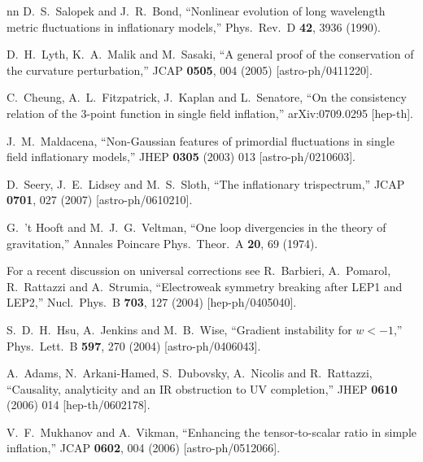 \documentclass[12pt,letterpaper]{article}
\begin{document}
{\begin{thebibliography}{nn}
  D.~S.~Salopek and J.~R.~Bond,
  ``Nonlinear evolution of long wavelength metric fluctuations in inflationary
  models,''
  Phys.\ Rev.\  D {\bf 42}, 3936 (1990).

  D.~H.~Lyth, K.~A.~Malik and M.~Sasaki,
  ``A general proof of the conservation of the curvature perturbation,''
  JCAP {\bf 0505}, 004 (2005)
  [astro-ph/0411220].

  C.~Cheung, A.~L.~Fitzpatrick, J.~Kaplan and L.~Senatore,
  ``On the consistency relation of the 3-point function in single
  field inflation,'' arXiv:0709.0295 [hep-th].

 J.~M.~Maldacena,
 ``Non-Gaussian features of primordial fluctuations in single field
 inflationary models,''
 JHEP {\bf 0305} (2003) 013
 [astro-ph/0210603].

  D.~Seery, J.~E.~Lidsey and M.~S.~Sloth,
  ``The inflationary trispectrum,''
  JCAP {\bf 0701}, 027 (2007)
  [astro-ph/0610210].

  G.~'t Hooft and M.~J.~G.~Veltman,
  ``One loop divergencies in the theory of gravitation,''
  Annales Poincare Phys.\ Theor.\  A {\bf 20}, 69 (1974).
 
  For a recent discussion on universal corrections see R.~Barbieri, A.~Pomarol, R.~Rattazzi and A.~Strumia,
  ``Electroweak symmetry breaking after LEP1 and LEP2,''
  Nucl.\ Phys.\  B {\bf 703}, 127 (2004)
  [hep-ph/0405040].

  S.~D.~H.~Hsu, A.~Jenkins and M.~B.~Wise,
  ``Gradient instability for $w < -1$,''
  Phys.\ Lett.\  B {\bf 597}, 270 (2004)
  [astro-ph/0406043].

  A.~Adams, N.~Arkani-Hamed, S.~Dubovsky, A.~Nicolis and R.~Rattazzi,
  ``Causality, analyticity and an IR obstruction to UV completion,''
  JHEP {\bf 0610} (2006) 014
  [hep-th/0602178].

  V.~F.~Mukhanov and A.~Vikman,
  ``Enhancing the tensor-to-scalar ratio in simple inflation,''
  JCAP {\bf 0602}, 004 (2006)
  [astro-ph/0512066].


\end{thebibliography}}
\end{document}
